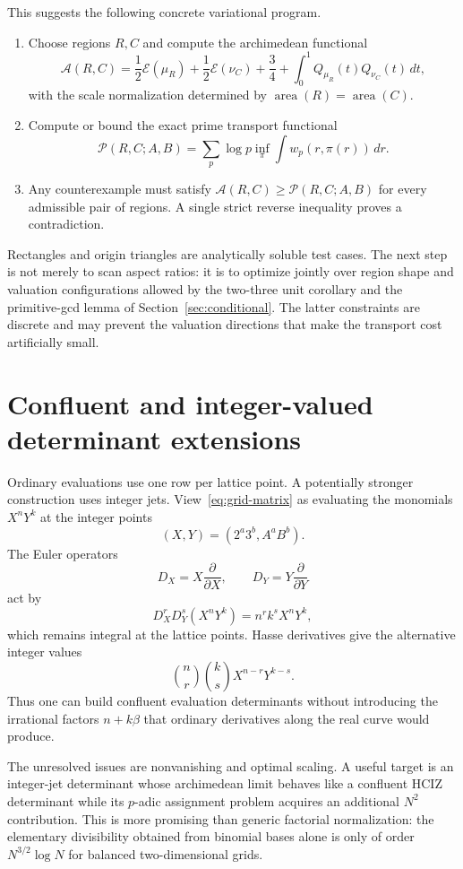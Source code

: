 \documentclass[11pt,oneside]{article}
\theoremstyle{definition}
\theoremstyle{remark}
\begin{document}
This suggests the following concrete variational program.
\begin{enumerate}
\item Choose regions $R,C$ and compute the archimedean functional
\[
 \mathcal A(R,C)=\frac12\mathcal E(\mu_R)
 +\frac12\mathcal E(\nu_C)+\frac34
 +\int_0^1Q_{\mu_R}(t)Q_{\nu_C}(t)\,dt,
\]
with the scale normalization determined by $\operatorname{area}(R)
=\operatorname{area}(C)$.
\item Compute or bound the exact prime transport functional
\[
 \mathcal P(R,C;A,B)=
 \sum_p\log p\inf_{\pi}
 \int w_p(r,\pi(r))\,dr.
\]
\item Any counterexample must satisfy
$\mathcal A(R,C)\ge\mathcal P(R,C;A,B)$ for every admissible pair of regions.
A single strict reverse inequality proves a contradiction.
\end{enumerate}

Rectangles and origin triangles are analytically soluble test cases.  The next
step is not merely to scan aspect ratios: it is to optimize jointly over region
shape and valuation configurations allowed by
the two-three unit corollary and the primitive-gcd lemma of
Section~\ref{sec:conditional}.  The latter
constraints are discrete and may prevent the valuation directions that make
the transport cost artificially small.

\section{Confluent and integer-valued determinant extensions}

Ordinary evaluations use one row per lattice point.  A potentially stronger
construction uses integer jets.  View~\eqref{eq:grid-matrix} as evaluating the
monomials $X^nY^k$ at the integer points
\[
 (X,Y)=(2^a3^b,A^aB^b).
\]
The Euler operators
\[
 D_X=X\frac{\partial}{\partial X},\qquad
 D_Y=Y\frac{\partial}{\partial Y}
\]
act by
\[
 D_X^rD_Y^s(X^nY^k)=n^rk^sX^nY^k,
\]
which remains integral at the lattice points.  Hasse derivatives give the
alternative integer values
\[
 \binom nr\binom ksX^{n-r}Y^{k-s}.
\]
Thus one can build confluent evaluation determinants without introducing the
irrational factors $n+k\beta$ that ordinary derivatives along the real curve
would produce.

The unresolved issues are nonvanishing and optimal scaling.  A useful target
is an integer-jet determinant whose archimedean limit behaves like a confluent
HCIZ determinant while its $p$-adic assignment problem acquires an additional
$N^2$ contribution.  This is more promising than generic factorial
normalization: the elementary divisibility obtained from binomial bases alone
is only of order $N^{3/2}\log N$ for balanced two-dimensional grids.
\end{document}
